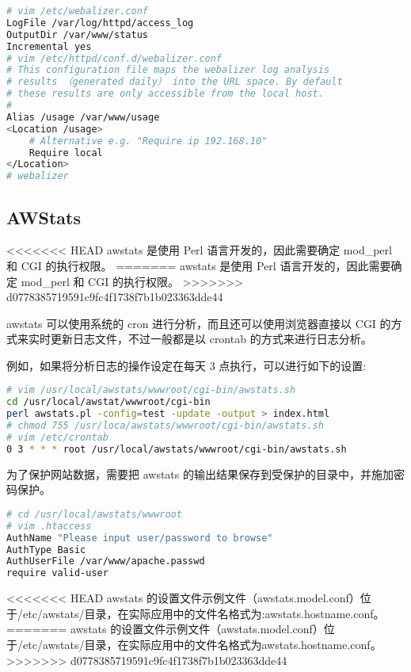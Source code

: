 \begin{lstlisting}[language=bash]
# vim /etc/webalizer.conf
LogFile /var/log/httpd/access_log
OutputDir /var/www/status
Incremental yes
# vim /etc/httpd/conf.d/webalizer.conf
# This configuration file maps the webalizer log analysis
# results （generated daily） into the URL space. By default
# these results are only accessible from the local host.
#
Alias /usage /var/www/usage
<Location /usage>
	# Alternative e.g. "Require ip 192.168.10"
	Require local
</Location>
# webalizer
\end{lstlisting}




\subsection{AWStats}

<<<<<<< HEAD
awstats 是使用 Perl 语言开发的，因此需要确定 mod_perl 和 CGI 的执行权限。
=======
awstats 是使用 Perl 语言开发的，因此需要确定 mod\_perl 和 CGI 的执行权限。
>>>>>>> d0778385719591c9fc4f1738f7b1b023363dde44

awstats 可以使用系统的 cron 进行分析，而且还可以使用浏览器直接以 CGI 的方式来实时更新日志文件，不过一般都是以 crontab 的方式来进行日志分析。

例如，如果将分析日志的操作设定在每天 3 点执行，可以进行如下的设置:


\begin{lstlisting}[language=bash]
# vim /usr/local/awstats/wwwroot/cgi-bin/awstats.sh
cd /usr/local/awstat/wwwroot/cgi-bin
perl awstats.pl -config=test -update -output > index.html
# chmod 755 /usr/loca/awstats/wwwroot/cgi-bin/awstats.sh
# vim /etc/crontab
0 3 * * * root /usr/local/awstats/wwwroot/cgi-bin/awstats.sh
\end{lstlisting}



为了保护网站数据，需要把 awstats 的输出结果保存到受保护的目录中，并施加密码保护。




\begin{lstlisting}[language=bash]
# cd /usr/local/awstats/wwwroot
# vim .htaccess
AuthName "Please input user/password to browse"
AuthType Basic
AuthUserFile /var/www/apache.passwd
require valid-user
\end{lstlisting}

<<<<<<< HEAD
awstats 的设置文件示例文件（awstats.model.conf）位于/etc/awstats/目录，在实际应用中的文件名格式为:awstats.hostname.conf。
=======
awstats 的设置文件示例文件（awstats.model.conf）位于/etc/awstats/目录，在实际应用中的文件名格式为awstats.hostname.conf。
>>>>>>> d0778385719591c9fc4f1738f7b1b023363dde44






